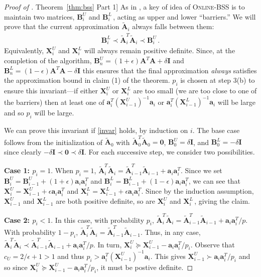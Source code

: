 \documentclass[11pt]{article}
\numberwithin{equation}{section}
\theoremstyle{definition}
\theoremstyle{plain}
\newcommand{\expref}[2]{\hyperref[#2]{#1~\ref{#2}}}
\newcommand{\bv}[1]{\mathbf{#1}}
\begin{document}
\begin{proof}[Proof of \expref{Theorem}{thm:bss} Part 1]
As in \cite{batson2012twice},
a key of idea of \textsc{Online-BSS} is to maintain two matrices, $\bv{B}^U_i$ and $\bv{B}^L_i$\,, acting as upper and lower ``barriers.''  We will prove that the current approximation $\bv{\tilde  A}_i$ always falls between them:
\begin{align}\label{invar}
\bv{B}^L_i \prec \bv{\tilde{A}}_i^T \bv{\tilde{A}}_i \prec \bv{B}^U_i\,.
\end{align}
%
Equivalently, $\bv{X}^U_i$ and $\bv{X}^L_i$ will always remain positive definite. Since, at the completion of the algorithm, $\bv{B}^U_n = (1+\epsilon) \bv{A}^T \bv{A} + \delta \bv{I}$ and $\bv{B}^L_n = (1-\epsilon) \bv{A}^T \bv{A} - \delta \bv{I}$ this ensures that the final approximation \emph{always} satisfies the approximation bound in claim (1) of the theorem. $p_i$ is chosen at step 3(b) to ensure this invariant---if either $\bv{X}^U_i$ or $\bv{X}^L_i$ are too small (we are too close to one of the barriers) then at least one of  $\bv{a}_i^T (\bv{X}^U_{i-1})^{-1} \bv{a}_i$ or $\bv{a}_i^T (\bv{X}^L_{i-1})^{-1} \bv{a}_i$ will be large and so $p_i$ will be large.

We can prove this invariant
%
if \eqref{invar} holds,  %
by induction on $i$.  The base case follows from the initialization of $\bv{\tilde{A}}_0$ with $\bv{\tilde{A}}_0^T \bv{\tilde{A}}_0 = \bv{0}$, $\bv{B}^U_0 = \delta \bv{I}$, and $\bv{B}^L_0 = -\delta \bv{I}$ since clearly $-\delta \bv I \prec \bv{0} \prec \delta \bv{I}$.  For each successive step, we consider two possibilities.

\textbf{Case 1: $p_i = 1$}.  When $p_i =1$, $\bv{\tilde{A}}_i^T \bv{\tilde{A}}_i = \bv{\tilde{A}}_{i-1}^T \bv{\tilde{A}}_{i-1} + \bv{a}_i \bv{a}_i^T$. Since we set  $\bv{B}_i^U = \bv{B}_{i-1}^U + (1+\epsilon) \bv{a}_i \bv{a}_i^T$ and $\bv{B}_i^L = \bv{B}_{i-1}^L + (1-\epsilon) \bv{a}_i \bv{a}_i^T$, we can see that $\bv{X}_i^U = \bv{X}_{i-1}^U + \epsilon \bv{a}_i \bv{a}_i^T $ and $\bv{X}_i^L = \bv{X}_{i-1}^L + \epsilon \bv{a}_i \bv{a}_i^T $. Since by the induction assumption, $ \bv{X}_{i-1}^U$ and $ \bv{X}_{i-1}^L$ are both positive definite, so are $ \bv{X}_{i}^U$ and $ \bv{X}_{i}^L$\,, giving the claim.

\textbf{Case 2:  $p_i < 1$}. In this case, with probability $p_i$, $\bv{\tilde{A}}_i^T \bv{\tilde{A}}_i = \bv{\tilde{A}}_{i-1}^T \bv{\tilde{A}}_{i-1} +  \bv{a}_i \bv{a}_i^T/p$. With probability $1-p_i$, $\bv{\tilde{A}}_i^T \bv{\tilde{A}}_i = \bv{\tilde{A}}_{i-1}^T \bv{\tilde{A}}_{i-1}$. Thus, in any case,  $\bv{\tilde{A}}_i^T \bv{\tilde{A}}_i \prec \bv{\tilde{A}}_{i-1}^T \bv{\tilde{A}}_{i-1} + \bv{a}_i \bv{a}_i^T/p$. In turn, $\bv{X}_{i}^U \succeq \bv{X}_{i-1}^U -{\bv{a}_i \bv{a}_i^T}/{p_i}$. 
Observe that $c_U = 2/\epsilon + 1 > 1$ and thus $p_i >   \bv{a}_i^T (\bv{X}^U_{i-1})^{-1} \bv{a}_i$. This gives $\bv{X}^U_{i-1} \succ{\bv{a}_i \bv{a}_i^T}/{p_i}$ and so since $\bv{X}_i^U  \succeq \bv{X}_{i-1}^U -{\bv{a}_i \bv{a}_i^T}/{p_i}$, it must be postive definite. 


\end{proof}
\end{document}
